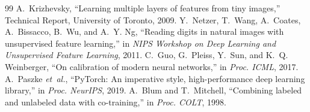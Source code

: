 \documentclass[conference,a4paper]{IEEEtran}
\begin{document}
\begin{thebibliography}{99}
 A.~Krizhevsky, ``Learning multiple layers of features from tiny images,'' Technical Report, University of Toronto, 2009.
 Y.~Netzer, T.~Wang, A.~Coates, A.~Bissacco, B.~Wu, and A.~Y. Ng, ``Reading digits in natural images with unsupervised feature learning,'' in \emph{NIPS Workshop on Deep Learning and Unsupervised Feature Learning}, 2011.
 C.~Guo, G.~Pleiss, Y.~Sun, and K.~Q. Weinberger, ``On calibration of modern neural networks,'' in \emph{Proc. ICML}, 2017.
 A.~Paszke \emph{et~al.}, ``{PyTorch}: An imperative style, high-performance deep learning library,'' in \emph{Proc. NeurIPS}, 2019.
 A.~Blum and T.~Mitchell, ``Combining labeled and unlabeled data with co-training,'' in \emph{Proc. COLT}, 1998.
\end{thebibliography}
\end{document}
